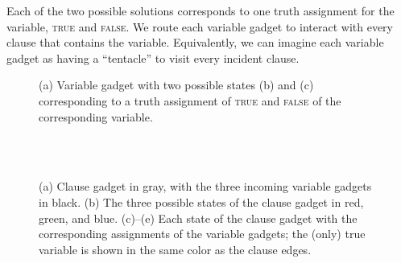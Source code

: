 Each of the two possible solutions corresponds to one truth assignment
for the variable, \textsc{true} and \textsc{false}.
We route each variable gadget to interact with every clause that contains
the variable.  Equivalently, we can imagine each variable gadget as having
a ``tentacle'' to visit every incident clause.


\begin{figure}
\centering
\hspace*{.1\textwidth}
\hfill
{}\hfill
{}
\hspace*{.1\textwidth}
  \caption{\small (a) Variable gadget with two possible states (b) and (c) corresponding to a truth assignment of \textsc{true} and \textsc{false} of the corresponding variable. }
  \label{fig:3-1-var}
\end{figure}

\iffalse
Negating a variable corresponds to inserting a \defn{negation gadget} into the corridor, and to continue with another variable corridor as in Figure~\ref{fig:3-1-neg}.


\begin{figure}
\centering
\hspace*{.1\textwidth}
\comic{.35\textwidth}{3-1-negation-a}{(a)}\hfill
\comic{.35\textwidth}{3-1-negation-b}{(b)}
\hspace*{.1\textwidth}
  \caption{\small Negation gadget in gray, with two black variable gadgets. The incoming variable gadget on the left, has a different truth assignment than the outgoing variable gadget on the right, two cases shown in (a)/(b).
}
  \label{fig:3-1-neg}
\end{figure}
\fi

\begin{figure}
\centering
{}\hfill
{}\\
\hfill
{}\\
\vspace*{-.2cm}
  \caption{\small (a) Clause gadget in gray, with the three incoming variable gadgets in black.  (b) The three possible states of the clause gadget in red, green, and blue. (c)--(e) Each state of the clause gadget with the corresponding assignments of the variable gadgets; the (only) true variable is shown in the same color as the clause edges.}
  \label{fig:3-1-clause}
\end{figure}

